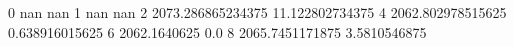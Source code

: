 0 nan nan
1 nan nan
2 2073.286865234375 11.122802734375
4 2062.802978515625 0.638916015625
6 2062.1640625 0.0
8 2065.7451171875 3.5810546875
